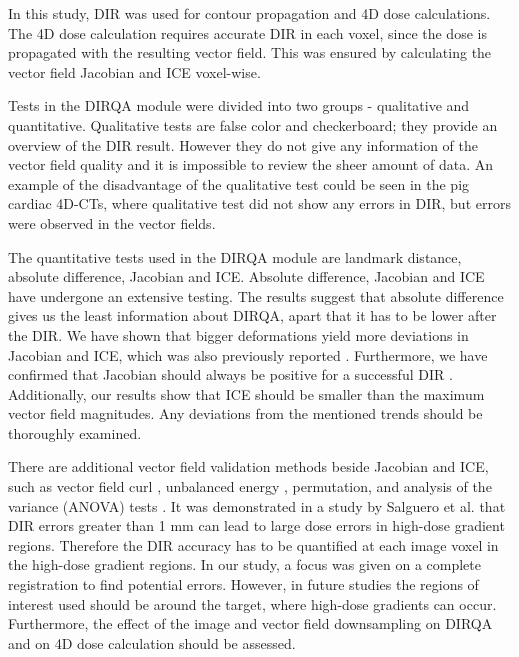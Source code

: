 In this study, DIR was used for contour propagation and 4D dose calculations. The 4D dose calculation requires 
accurate DIR in each voxel, since the dose is propagated with the resulting vector field. This was ensured by calculating the vector field Jacobian and ICE voxel-wise. 

Tests in the DIRQA module were divided into two groups - qualitative and quantitative. Qualitative tests are false color and checkerboard; they provide an overview of the DIR result.
However they do not give any information of the vector field quality and it is impossible to review the sheer amount of data. An example of the disadvantage of the qualitative test could be seen in the pig cardiac 4D-CTs, where qualitative test did not show
any errors in DIR, but errors were observed in the vector fields. 

The quantitative tests used in the DIRQA module are landmark distance, absolute difference, Jacobian and ICE. Absolute difference, Jacobian and ICE have undergone an extensive testing. The results suggest
that absolute difference gives us the least information about DIRQA, apart that it has to be lower after the DIR. 
We have shown that bigger deformations yield more deviations in Jacobian and ICE, which was also previously reported \cite{Stanley2013}. 
Furthermore, we have confirmed that Jacobian should always be positive for a successful DIR \cite{Rey2002}. Additionally, our results show that ICE should 
be smaller than the maximum vector field magnitudes. Any deviations from the mentioned trends should be thoroughly examined.

There are additional vector field validation methods beside Jacobian and ICE, such as vector field curl \cite{Schreibmann2012}, unbalanced energy \cite{Zhong2007}, 
permutation, and analysis of the variance (ANOVA) tests \cite{Klein2009}.
It was demonstrated in a study by Salguero et al. \cite{Salguero2011} that DIR errors greater than 1 mm can lead to large dose errors in high-dose gradient regions. 
Therefore the DIR accuracy has to be quantified at each image voxel in the high-dose 
gradient regions. In our study, a focus was given on a complete registration to find potential errors. However, in future studies the regions of interest used
should be around the target, where high-dose gradients can occur. Furthermore, the effect of the image and vector field downsampling on DIRQA and on 4D dose calculation should be assessed.

